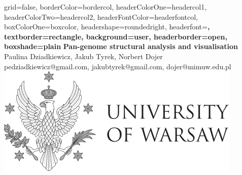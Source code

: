 \documentclass[a0paper,portrait]{baposter}
\begin{document}
\begin{poster}{
grid=false,
borderColor=bordercol, %
headerColorOne=headercol1, %
headerColorTwo=headercol2, %
headerFontColor=headerfontcol, %
boxColorOne=boxcolor, %
headershape=roundedright, %
headerfont=\Large\sf\bf, %
textborder=rectangle,
background=user,
headerborder=open, %
boxshade=plain
}
{}
%
%
{\sf\bf Pan-genome structural analysis and visualisation} %
{\vspace{1em} Paulina Dziadkiewicz, Jakub Tyrek, Norbert Dojer\\ %
{\smaller pedziadkiewicz@gmail.com, jakubtyrek@gmail.com, dojer@mimuw.edu.pl}} %
{\includegraphics[scale=0.6]{english_logo}} %




\end{poster}
\end{document}
